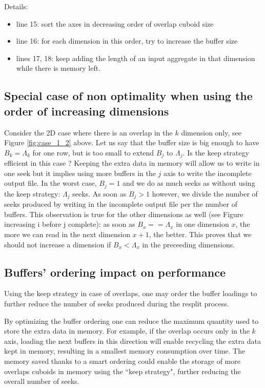\documentclass[conference]{IEEEtran}
\begin{document}
Details:
\begin{itemize}
  \item line 15: sort the axes in decreasing order of overlap cuboid size
  \item line 16: for each dimension in this order, try to increase the buffer size
  \item lines 17, 18: keep adding the length of an input aggregate in that dimension while there is memory left.
\end{itemize}


\subsection{Special case of non optimality when using the order of increasing dimensions}

Consider the 2D case where there is an overlap in the $k$ dimension only, see Figure \ref{fig:case_1_2} above.
Let us say that the buffer size is big enough to have $B_k = \Lambda_k$ for one row, but is too small to extend $B_j$ to $\Lambda_j$.
Is the keep strategy efficient in this case ?
Keeping the extra data in memory will allow us to write in one seek but it implies using more buffers in the $j$ axis to write the incomplete output file.
In the worst case, $B_j = 1$ and we do as much seeks as without using the keep strategy: $\Lambda_j$ seeks.
As soon as $B_j > 1$ however, we divide the number of seeks produced by writing in the incomplete output file per the number of buffers.
This observation is true for the other dimensions as well (see Figure increasing i before j complete): as soon as $B_x == \Lambda_x$ in one dimension $x$, the more we can read in the next dimension $x+1$, the better.
This proves that we should not increase a dimension if $B_x < \Lambda_x$ in the preceeding dimensions.

\subsection{Buffers' ordering impact on performance}

Using the keep strategy in case of overlaps, one may order the buffer loadings to further reduce the number of seeks produced during the resplit process.

By optimizing the buffer ordering one can reduce the maximum quantity used to store the extra data in memory.
For example, if the overlap occurs only in the $k$ axis, loading the next buffers in this direction will enable recycling the extra data kept in memory, resulting in a smallest memory consumption over time.
The memory saved thanks to a smart ordering could enable the storage of more overlaps cuboids in memory using the ``keep strategy", further reducing the overall number of seeks. \\
\end{document}
